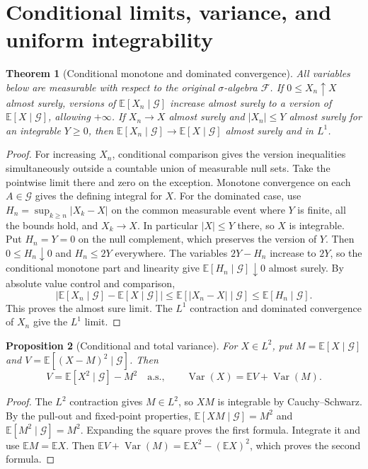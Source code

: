 \documentclass[11pt,oneside,openany]{book}
\theoremstyle{plain}
\newtheorem{theorem}{Theorem}[chapter]
\newtheorem{proposition}[theorem]{Proposition}
\theoremstyle{definition}
\theoremstyle{remark}
\begin{document}
\section{Conditional limits, variance, and uniform integrability}
\label{p03-04}

\begin{theorem}[Conditional monotone and dominated convergence]
\label{thm:prob-condexp-convergence}
All variables below are measurable with respect to the original
\(\sigma\)-algebra \(\mathcal F\).
If \(0\le X_n\uparrow X\) almost surely, versions of
\(\mathbb E[X_n\mid\mathcal G]\) increase almost surely to a
version of \(\mathbb E[X\mid\mathcal G]\), allowing \(+\infty\).
If \(X_n\to X\) almost surely and \(|X_n|\le Y\) almost surely
for an integrable \(Y\ge0\), then
\(\mathbb E[X_n\mid\mathcal G]\to \mathbb E[X\mid\mathcal G]\)
almost surely and in \(L^1\).
\end{theorem}
\begin{proof}
For increasing \(X_n\), conditional comparison gives the
version inequalities simultaneously outside a countable union
of measurable null sets. Take the pointwise limit there and
zero on the exception. Monotone convergence on each
\(A\in\mathcal G\) gives the defining integral for \(X\).
For the dominated case, use \(H_n=\sup_{k\ge n}|X_k-X|\) on the
common measurable event where \(Y\) is finite, all the bounds hold,
and \(X_k\to X\). In particular \(|X|\le Y\) there, so \(X\)
is integrable. Put \(H_n=Y=0\) on the null complement, which
preserves the version of \(Y\). Then \(0\le H_n\downarrow0\) and
\(H_n\le 2Y\) everywhere. The variables \(2Y-H_n\) increase to
\(2Y\), so the conditional monotone
part and linearity give \(\mathbb E[H_n\mid\mathcal G]\downarrow0\)
almost surely. By absolute value control and comparison,
\[
 |\mathbb E[X_n\mid\mathcal G]-\mathbb E[X\mid\mathcal G]|
 \le \mathbb E[|X_n-X|\mid\mathcal G]
 \le \mathbb E[H_n\mid\mathcal G].
\]
This proves the almost sure limit. The \(L^1\) contraction
and dominated convergence of \(X_n\) give the \(L^1\) limit.
\end{proof}

\begin{proposition}[Conditional and total variance]
\label{thm:prob-cond-variance}
For \(X\in L^2\), put \(M=\mathbb E[X\mid\mathcal G]\) and
\(V=\mathbb E[(X-M)^2\mid\mathcal G]\). Then
\[
 V=\mathbb E[X^2\mid\mathcal G]-M^2\quad\text{a.s.},
 \qquad
 \operatorname{Var}(X)=\mathbb E V+\operatorname{Var}(M).
\]
\end{proposition}
\begin{proof}
The \(L^2\) contraction gives \(M\in L^2\), so \(XM\) is
integrable by Cauchy--Schwarz. By the pull-out and fixed-point
properties, \(\mathbb E[XM\mid\mathcal G]=M^2\) and
\(\mathbb E[M^2\mid\mathcal G]=M^2\). Expanding the square
proves the first formula. Integrate it and use \(\mathbb E M=\mathbb E X\).
Then \(\mathbb E V+\operatorname{Var}(M)
=\mathbb E X^2-(\mathbb E X)^2\), which proves the second formula.
\end{proof}
\end{document}
